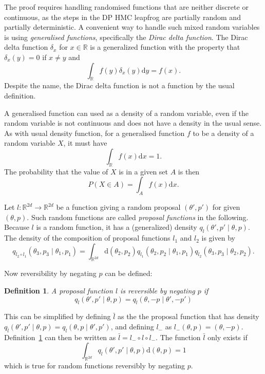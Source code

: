 \documentclass[english,twoside,openright]{HYgraduMLDS}
\newtheorem{definition}{Definition}
\newcommand{\R}{\mathbb{R}}
\newcommand{\dx}{\mathrm{d}}
\begin{document}
The proof requires handling randomised functions that are neither discrete or
continuous, as the steps in the DP HMC leapfrog are partially random and
partially deterministic. A convenient way to handle such mixed random variables
is using \emph{generalised functions}, specifically the
\emph{Dirac delta function}. The Dirac delta function \(\delta_{x}\) for
\(x\in \R\) is a
generalized function with the property that \(\delta_{x}(y) = 0\) if
\(x \neq y\) and
\[
  \int_{\R} f(y)\delta_{x}(y) \dx y = f(x).
\]
Despite the name, the Dirac delta function is not a function by the usual
definition.

A generalised function can used as a density of a random variable, even if the
random variable is not continuous and does not have a density in the usual
sense. As with usual density function, for a generalised function \(f\) to be
a density of a random variable \(X\), it must have
\[
  \int_{\R} f(x)\dx x = 1.
\]
The probability that the value of \(X\) is in a given set \(A\) is then
\[
  P(X\in A) = \int_{A} f(x)\dx x.
\]

Let \(l\colon \R^{2d} \to \R^{2d}\) be a function giving a random
proposal \((\theta', p')\) for given \((\theta, p)\). Such random functions are called
\emph{proposal functions} in the following. Because \(l\) is a random function,
it has a (generalized) density \(q_{l}(\theta', p' \mid \theta, p)\).
The density of the composition of proposal functions \(l_{1}\) and \(l_{2}\)
is given by
\[
  q_{l_{2}\circ l_{1}}(\theta_{3}, p_{3}\mid \theta_{1}, p_{1})
  = \int_{\R^{2d}}\dx(\theta_{2}, p_{2})
  q_{l_{1}}(\theta_{2}, p_{2}\mid \theta_{1}, p_{1})
  q_{l_{2}}(\theta_{3}, p_{3}\mid \theta_{2}, p_{2}).
\]

Now reversibility by negating \(p\) can be defined:
\begin{definition}\label{prop_revers_definition}
  A proposal function \(l\) is reversible by negating \(p\) if
  \[
    q_{l}(\theta', p'\mid \theta, p) = q_{l}(\theta, -p \mid \theta', -p')
  \]
\end{definition}
This can be simplified by defining \(\bar{l}\) as the the proposal
function that has density
\(q_{\bar{l}}(\theta', p'\mid \theta, p) = q_{l}(\theta, p\mid \theta', p')\),
and defining \(l_{-}\) as \(l_{-}(\theta, p) = (\theta, -p)\).
Definition~\ref{prop_revers_definition} can then be written as
\(\bar{l} = l_{-}\circ l\circ l_{-}\). The function \(\bar{l}\) only exists
if
\[
  \int_{\R^{2d}}q_{l}(\theta', p'\mid \theta, p)\dx(\theta, p) = 1
\]
which is true for random functions reversibly by negating \(p\).
\end{document}
